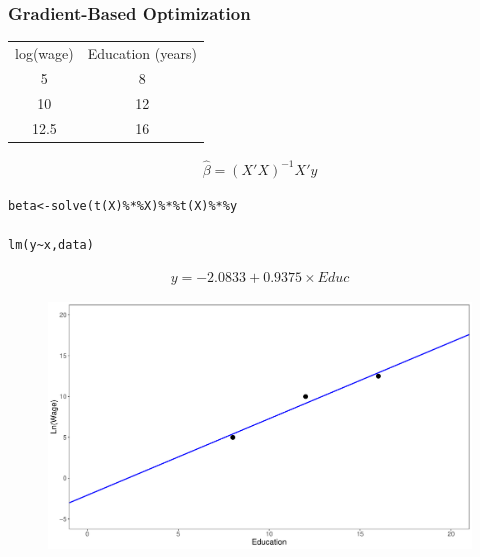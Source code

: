 \documentclass[
  shownotes,
  xcolor={svgnames},
  hyperref={colorlinks,citecolor=DarkBlue,linkcolor=DarkRed,urlcolor=DarkBlue}
  , aspectratio=169]{beamer}
\newenvironment{Shaded}{\begin{snugshade}}{\end{snugshade}}
\begin{document}
\begin{frame}[fragile]
\frametitle{Gradient-Based Optimization}





\begin{minipage}[c]{0.38\linewidth}
        
\begin{table}[]
\begin{tabular}{cc}
log(wage) & Education (years) \\
5         & 8                                                         \\
10        & 12                                                          \\
12.5      & 16                                                          \\
\end{tabular}
\end{table}

\bigskip

\begin{align}
\hat \beta=(X'X)^{-1}X'y \nonumber
\end{align}




\begin{Shaded}
\begin{verbatim}
beta<-solve(t(X)%*%X)%*%t(X)%*%y

lm(y~x,data)
\end{verbatim}
\end{Shaded}

\begin{align}
y=-2.0833 +  0.9375 \times Educ \nonumber
\end{align}

    \end{minipage}
    \hfill
    \begin{minipage}[c]{0.58\linewidth}%
        \begin{figure}[H] \centering
            \captionsetup{justification=centering}  
            \includegraphics[scale=0.25]{figures/fig_1b.pdf}
    \end{figure}
    \end{minipage}

\end{frame}
\end{document}
